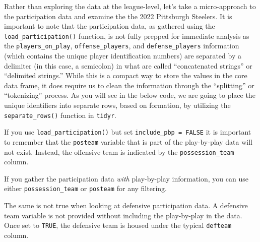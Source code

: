 \documentclass[
  letterpaper,
]{krantz}
\begin{document}
Rather than exploring the data at the league-level, let's take a
micro-approach to the participation data and examine the the 2022
Pittsburgh Steelers. It is important to note that the participation
data, as gathered using the \texttt{load\_participation()} function, is
not fully prepped for immediate analysis as the
\texttt{players\_on\_play}, \texttt{offense\_players}, and
\texttt{defense\_players} information (which contains the unique player
identification numbers) are separated by a delimiter (in this case, a
semicolon) in what are called ``concatenated strings'' or ``delimited
strings.'' While this is a compact way to store the values in the core
data frame, it does require us to clean the information through the
``splitting'' or ``tokenizing'' process. As you will see in the below
code, we are going to place the unique identifiers into separate rows,
based on formation, by utilizing the \texttt{separate\_rows()} function
in \texttt{tidyr}.

\begin{tcolorbox}[enhanced jigsaw, left=2mm, toprule=.15mm, opacitybacktitle=0.6, leftrule=.75mm, bottomrule=.15mm, colbacktitle=quarto-callout-tip-color!10!white, breakable, colback=white, bottomtitle=1mm, toptitle=1mm, title=\textcolor{quarto-callout-tip-color}{\faLightbulb}\hspace{0.5em}{Tip}, coltitle=black, titlerule=0mm, arc=.35mm, opacityback=0, colframe=quarto-callout-tip-color-frame, rightrule=.15mm]

If you use \texttt{load\_participation()} but set
\texttt{include\_pbp\ =\ FALSE} it is important to remember that the
\texttt{posteam} variable that is part of the play-by-play data will not
exist. Instead, the offensive team is indicated by the
\texttt{possession\_team} column.

If you gather the participation data \emph{with} play-by-play
information, you can use either \texttt{possession\_team} or
\texttt{posteam} for any filtering.

The same is not true when looking at defensive participation data. A
defensive team variable is not provided without including the
play-by-play in the data. Once set to \texttt{TRUE}, the defensive team
is housed under the typical \texttt{defteam} column.

\end{tcolorbox}
\end{document}
